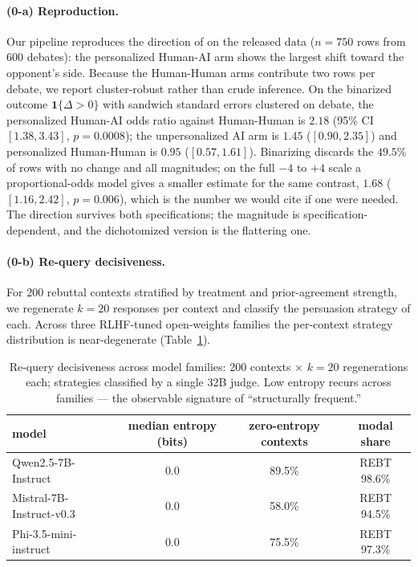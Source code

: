 \documentclass[11pt]{article}
\theoremstyle{definition}
\theoremstyle{remark}
\begin{document}
\paragraph{(0-a) Reproduction.} Our pipeline reproduces the direction of
\citet{salvi2025conversational} on the released data ($n = 750$ rows from
$600$ debates): the personalized Human-AI arm shows the largest shift toward
the opponent's side. Because the Human-Human arms contribute two rows per
debate, we report cluster-robust rather than crude inference. On the
binarized outcome $\mathbf{1}\{\Delta > 0\}$ with sandwich standard errors
clustered on debate, the personalized Human-AI odds ratio against
Human-Human is $2.18$ (95\% CI $[1.38, 3.43]$, $p = 0.0008$); the
unpersonalized AI arm is $1.45$ ($[0.90, 2.35]$) and personalized
Human-Human is $0.95$ ($[0.57, 1.61]$). Binarizing discards the $49.5\%$ of
rows with no change and all magnitudes; on the full $-4$ to $+4$ scale a
proportional-odds model gives a smaller estimate for the same contrast,
$1.68$ ($[1.16, 2.42]$, $p = 0.006$), which is the number we would cite if
one were needed. The direction survives both specifications; the magnitude
is specification-dependent, and the dichotomized version is the flattering
one.

\paragraph{(0-b) Re-query decisiveness.} For 200 rebuttal contexts stratified
by treatment and prior-agreement strength, we regenerate $k = 20$ responses
per context and classify the persuasion strategy of each. Across three
RLHF-tuned open-weights families the per-context strategy distribution is
near-degenerate (Table~\ref{tab:models}).

\begin{table}[t]
\centering
\begin{tabular}{lccc}
\toprule
model & median entropy (bits) & zero-entropy contexts & modal share \\
\midrule
Qwen2.5-7B-Instruct & 0.0 & 89.5\% & REBT 98.6\% \\
Mistral-7B-Instruct-v0.3 & 0.0 & 58.0\% & REBT 94.5\% \\
Phi-3.5-mini-instruct & 0.0 & 75.5\% & REBT 97.3\% \\
\bottomrule
\end{tabular}
\caption{Re-query decisiveness across model families: 200 contexts $\times$
$k=20$ regenerations each; strategies classified by a single 32B judge.
Low entropy recurs across families --- the observable signature of
``structurally frequent.''}
\label{tab:models}
\end{table}
\end{document}
